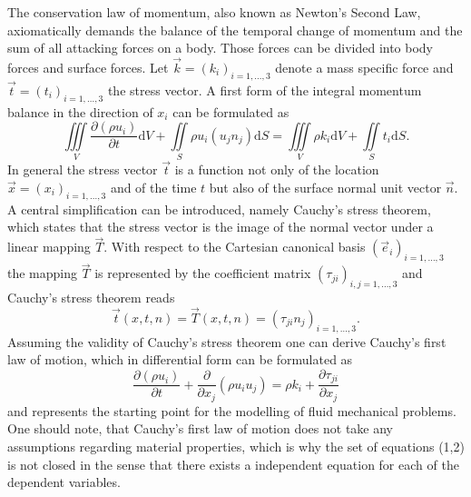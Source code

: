     The conservation law of momentum, also known as Newton's Second Law, axiomatically demands the balance of the temporal change of momentum and the sum of all attacking forces on a body. Those forces can be divided into body forces and surface forces. Let \(\vec{k} = \left( k_i \right)_{i=1,\dots,3}\) denote a mass specific force and \(\vec{t} = \left(t_i\right)_{i=1,\dots,3}\) the stress vector. A first form of the integral momentum balance in the direction of \(x_i\) can be formulated as
    \begin{displaymath}
      \iiint\limits_V \frac{\partial \left(\rho u_i \right)}{\partial t} \mathrm{d}V + \iint\limits_S \rho u_i \left( u_j n_j \right) \mathrm{d}S = \iiint\limits_V \rho k_i \mathrm{d}V + \iint\limits_S t_i \mathrm{d}S.
    \end{displaymath}
    In general the stress vector \(\vec{t}\) is a function not only of the location \(\vec{x} = \left( x_i \right)_{i = 1,\dots,3}\) and of the time \(t\) but also of the surface normal unit vector \(\vec{n}\). A central simplification can be introduced, namely Cauchy's stress theorem, which states that the stress vector is the image of the normal vector under a linear mapping \(\vec{T}\). With respect to the Cartesian canonical basis \(\left(\vec{e}_i \right)_{i = 1, \dots, 3}\) the mapping \(\vec{T}\) is represented by the coefficient matrix \( \left(\tau_{ji}\right)_{i,j = 1,\dots,3}\) and Cauchy's stress theorem reads
    \begin{displaymath}
      \vec{t}\left(x,t,n\right) = \vec{T}(x,t,n) = \left(\tau_{ji} n_j\right)_{i = 1, \dots, 3}.
    \end{displaymath}
    Assuming the validity of Cauchy's stress theorem one can derive Cauchy's first law of motion, which in differential form can be formulated as
    \begin{equation}
      \label{eq:cauchymotion}
      \frac{\partial \left(\rho u_i \right)}{\partial t} 
      + \frac{\partial}{\partial x_j}\left( \rho u_i u_j \right) 
      = \rho k_i + \frac{\partial \tau_{ji}}{\partial x_j}
    \end{equation}
    and represents the starting point for the modelling of fluid mechanical problems. One should note, that Cauchy's first law of motion does not take any assumptions regarding material properties, which is why the set of equations (1,2) is not closed in the sense that there exists a independent equation for each of the dependent variables.

